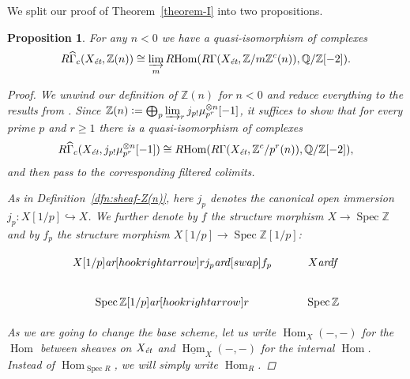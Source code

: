 \documentclass[leqno,12pt]{article}
\theoremstyle{plain}
\newtheorem{proposition}[theorem]{\indent\sc Proposition}
\theoremstyle{definition}
\DeclareMathOperator{\Spec}{Spec}
\DeclareMathOperator{\Hom}{Hom}
\newcommand{\QQ}{\mathbb{Q}}
\newcommand{\ZZ}{\mathbb{Z}}
\newcommand{\dfn}{\mathrel{\mathop:}=}
\newcommand{\ar}{\text{\it ar}}
\newcommand{\et}{\text{\it \'{e}t}}
\newcommand{\iHom}{\underline{\Hom}}
\newcommand{\RHom}{R\!\Hom}
\begin{document}
We split our proof of Theorem~\ref{theorem-I} into two propositions.

\begin{proposition}
  For any $n < 0$ we have a quasi-isomorphism of complexes
  \begin{equation}
    \label{eqn:duality-quasi-isomorphism-1}
    R\widehat{\Gamma}_c (X_\et, \ZZ (n)) \cong
    \varinjlim_m \RHom (R\Gamma (X_\et, \ZZ/m\ZZ^c (n)), \QQ/\ZZ [-2]).
  \end{equation}

  \begin{proof}
    We unwind our definition of $\ZZ (n)$ for $n < 0$ and reduce everything to
    the results from \cite{Geisser-2010}. Since
    $\ZZ (n) \dfn \bigoplus_p \varinjlim_r j_{p!} \mu_{p^r}^{\otimes n} [-1]$,
    it suffices to show that for every prime $p$ and $r\ge 1$ there is a
    quasi-isomorphism of complexes
    \begin{equation}
      \label{eqn:duality-quasi-isomorphism-1-pr}
      R\widehat{\Gamma}_c (X_\et, j_{p!} \mu_{p^r}^{\otimes n} [-1]) \cong
      \RHom (R\Gamma (X_\et, \ZZ^c/p^r (n)), \QQ/\ZZ [-2]),
    \end{equation}
    and then pass to the corresponding filtered colimits.

    As in Definition~\ref{dfn:sheaf-Z(n)}, here $j_p$ denotes the canonical open
    immersion $j_p\colon X[1/p] \hookrightarrow X$. We further denote by $f$ the
    structure morphism $X\to \Spec \ZZ$ and by $f_p$ the structure morphism
    $X [1/p] \to \Spec \ZZ [1/p]$:

    \[ \begin{tikzcd}
        X [1/p]\ar[hookrightarrow]{r}{j_p}\ar{d}[swap]{f_p} & X\ar{d}{f} \\
        \Spec \ZZ [1/p]\ar[hookrightarrow]{r} & \Spec \ZZ
      \end{tikzcd} \]
  
    As we are going to change the base scheme, let us write $\Hom_X (-,-)$ for
    the $\Hom$ between sheaves on $X_\et$ and $\iHom_X (-,-)$ for the
    internal $\Hom$. Instead of $\Hom_{\Spec R}$, we will simply write
    $\Hom_R$.


\end{proof}
\end{proposition}
\end{document}
